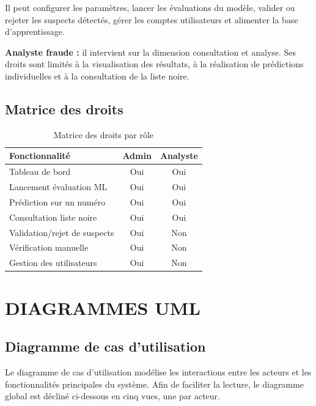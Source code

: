 \documentclass[12pt, oneside, a4paper]{report}
\begin{document}
Il peut configurer les paramètres, lancer les évaluations du modèle, valider ou rejeter les suspects détectés, gérer les comptes utilisateurs et alimenter la base d’apprentissage.

\textbf{Analyste fraude :} il intervient sur la dimension consultation et analyse. Ses droits sont limités à la visualisation des résultats, à la réalisation de prédictions individuelles et à la consultation de la liste noire.


\subsection{Matrice des droits}
\begin{table}[h!]
\centering
\caption{Matrice des droits par rôle}
\label{tab:droits}
\vspace{0.3cm}
\renewcommand{\arraystretch}{1.3}
\begin{tabular}{|l|c|c|}
\hline
\textbf{Fonctionnalité} & \textbf{Admin} & \textbf{Analyste} \\
\hline
Tableau de bord & Oui & Oui \\
\hline
Lancement évaluation ML & Oui & Oui \\
\hline
Prédiction sur un numéro & Oui & Oui \\
\hline
Consultation liste noire & Oui & Oui \\
\hline
Validation/rejet de suspects & Oui & Non \\
\hline
Vérification manuelle & Oui & Non \\
\hline
Gestion des utilisateurs & Oui & Non \\
\hline
\end{tabular}
\end{table}



\section{DIAGRAMMES UML}

\subsection{Diagramme de cas d'utilisation}

Le diagramme de cas d'utilisation modélise les interactions entre les
acteurs et les fonctionnalités principales du système. Afin de
faciliter la lecture, le diagramme global est décliné ci-dessous en
cinq vues, une par acteur.
\end{document}
